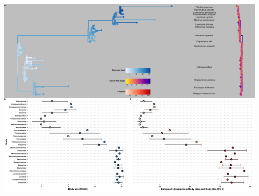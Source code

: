 \documentclass[]{elsarticle} %
\let\origfigure\figure
\let\endorigfigure\endfigure
\renewenvironment{figure}[1][2] {
    \expandafter\origfigure\expandafter[H]
} {
    \endorigfigure
}
\begin{document}
\begin{figure}[H]
\includegraphics[width=6in,]{paper_PLOS_draft_files/figure-latex/Figure-DoubleTree-Bodysize-Lifespan-1} \caption{Body sizes rapidly and frequently expand in Eutherians, especially in Atlantogenata. \textbf{A)} Back-to-back phylogeny for \emph{Atlantogenata}, scaled by log-fold increases in body mass (IBM, left) and log\_\{2\}-fold reduction in intrinsic cancer risk (RICR, right). \textbf{B)} Extant body sizes, plus estimated body sizes, for highlighted species and their ancestral nodes. \textbf{C)} Estimated Lifespans for body sizes in \textbf{B)}. Intervals are based on predicted lifespans of the 95\% CIs for body size.}\label{fig:Figure-DoubleTree-Bodysize-Lifespan}
\end{figure}
\end{document}
